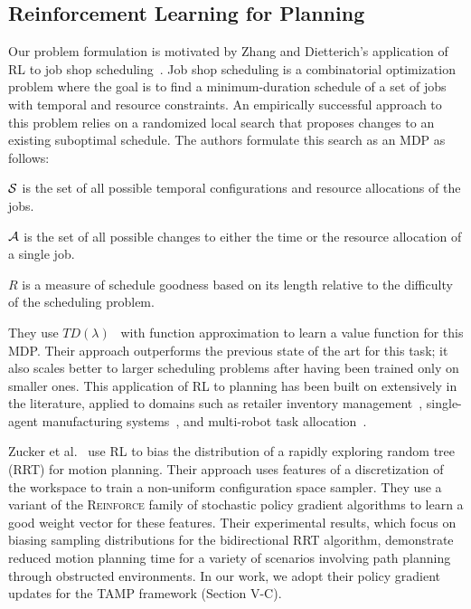 \subsection{Reinforcement Learning for Planning}
Our problem formulation is motivated by Zhang and Dietterich's application of RL to job
shop scheduling~\cite{JobShopSched}. Job shop scheduling is a combinatorial optimization problem where the goal is to find
a minimum-duration schedule of a set of jobs with temporal and resource constraints. An empirically
successful approach to this problem relies on a randomized local search that proposes changes to an
existing suboptimal schedule. The authors formulate this search as an MDP as follows:
\begin{tightlist}
\item $\mathcal{S}$ is the set of all possible temporal configurations and resource allocations of the jobs.
\item $\mathcal{A}$ is the set of all possible changes to either the time or the resource allocation of a single job.
\item $R$ is a measure of schedule goodness based on its length relative to the difficulty of the scheduling problem.
\end{tightlist}
They use $TD(\lambda)$~\cite{suttonbarto} with function approximation to learn a value function
for this MDP. Their approach outperforms the previous state of the art for this task;
it also scales better to larger scheduling problems after having been trained only on smaller ones.
This application of RL to planning has been built on extensively
in the literature, applied to domains such as retailer inventory
management~\cite{van1997neuro}, single-agent manufacturing systems~\cite{Wang200573}, and multi-robot
task allocation~\cite{dahl2009multi}.

Zucker et al.~\cite{workspacebias} use RL to bias the distribution of a rapidly exploring random tree (RRT)
for motion planning. Their approach uses features of a discretization of the workspace to train
a non-uniform configuration space sampler. They use a variant of the \textsc{Reinforce} family
of stochastic policy gradient algorithms to learn a good weight vector for these features.
Their experimental results, which focus on biasing sampling distributions for the bidirectional
RRT algorithm, demonstrate reduced motion planning time for a variety of scenarios involving path
planning through obstructed environments. In our work, we adopt their policy gradient updates for the TAMP framework
(Section V-C).

